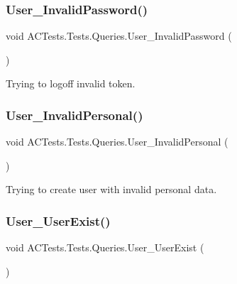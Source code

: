 \subsubsection{\texorpdfstring{User\+\_\+\+Invalid\+Password()}{User\_InvalidPassword()}}
{\footnotesize\ttfamily void A\+C\+Tests.\+Tests.\+Queries.\+User\+\_\+\+Invalid\+Password (\begin{DoxyParamCaption}{ }\end{DoxyParamCaption})}



Trying to logoff invalid token. 

\mbox{\label{class_a_c_tests_1_1_tests_1_1_queries_a0b53e9f54f2e773bf1a739b84afb7d1b}} 
\subsubsection{\texorpdfstring{User\+\_\+\+Invalid\+Personal()}{User\_InvalidPersonal()}}
{\footnotesize\ttfamily void A\+C\+Tests.\+Tests.\+Queries.\+User\+\_\+\+Invalid\+Personal (\begin{DoxyParamCaption}{ }\end{DoxyParamCaption})}



Trying to create user with invalid personal data. 

\mbox{\label{class_a_c_tests_1_1_tests_1_1_queries_ad06fcb257c730cd383f3484417c65a19}} 
\subsubsection{\texorpdfstring{User\+\_\+\+User\+Exist()}{User\_UserExist()}}
{\footnotesize\ttfamily void A\+C\+Tests.\+Tests.\+Queries.\+User\+\_\+\+User\+Exist (\begin{DoxyParamCaption}{ }\end{DoxyParamCaption})}



